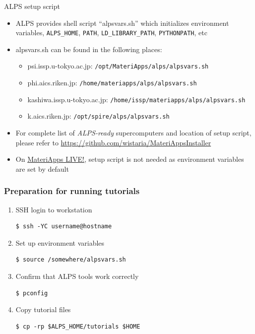 \begin{frame}[t,fragile]{ALPS setup script}
  \begin{itemize}
  \item ALPS provides shell script ``{\color {red}alpsvars.sh}'' which initializes environment variables, {\tt ALPS\_HOME}, {\tt PATH}, {\tt LD\_LIBRARY\_PATH}, {\tt PYTHONPATH}, etc
  \item alpsvars.sh can be found in the following places:
    \begin{itemize}
    \item psi.issp.u-tokyo.ac.jp:
      {\footnotesize \tt /opt/MateriApps/alps/alpsvars.sh}
    \item phi.aics.riken.jp:
      {\footnotesize \tt /home/materiapps/alps/alpsvars.sh}
    \item kashiwa.issp.u-tokyo.ac.jp:
      {\footnotesize \tt /home/issp/materiapps/alps/alpsvars.sh}
    \item k.aics.riken.jp:
      {\footnotesize \tt /opt/spire/alps/alpsvars.sh}
    \end{itemize}
  \item For complete list of {\color{red} {\em ALPS-ready} supercomputers} and location of setup script, please refer to \url{https://github.com/wistaria/MateriAppsInstaller}
  \item On \href{http://cmsi.github.io/MateriAppsLive/}{MateriApps LIVE!}, setup script is not needed as environment variables are set by default
  \end{itemize}
\end{frame}

\begin{frame}[t,fragile]
  \frametitle{Preparation for running tutorials}
  \begin{enumerate}
  \item SSH login to workstation
\begin{lstlisting}
$ ssh -YC username@hostname
\end{lstlisting}
  \item Set up environment variables
\begin{lstlisting}
$ source /somewhere/alpsvars.sh
\end{lstlisting}
  \item Confirm that ALPS tools work correctly
\begin{lstlisting}
$ pconfig
\end{lstlisting}
  \item Copy tutorial files
\begin{lstlisting}
$ cp -rp $ALPS_HOME/tutorials $HOME
\end{lstlisting}
  \end{enumerate}
\end{frame}

